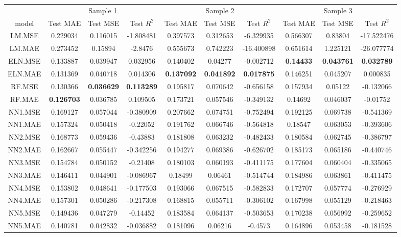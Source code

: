 \begin{table}[H]
\centering\begingroup\fontsize{6}{8}\selectfont

\begin{tabular}{cccccccccc}
\toprule
\multicolumn{1}{c}{ } & \multicolumn{3}{c}{Sample 1} & \multicolumn{3}{c}{Sample 2} & \multicolumn{3}{c}{Sample 3} \\
\cmidrule(l{3pt}r{3pt}){2-4} \cmidrule(l{3pt}r{3pt}){5-7} \cmidrule(l{3pt}r{3pt}){8-10}
model & Test MAE & Test MSE & Test $R^2$ & Test MAE & Test MSE & Test $R^2$ & Test MAE & Test MSE & Test $R^2$\\
\midrule
LM.MSE & 0.229034 & 0.116015 & -1.808481 & 0.397573 & 0.312653 & -6.329935 & 0.566307 & 0.83804 & -17.522476\\
LM.MAE & 0.273452 & 0.15894 & -2.8476 & 0.555673 & 0.742223 & -16.400898 & 0.651614 & 1.225121 & -26.077774\\
ELN.MSE & 0.133887 & 0.039947 & 0.032956 & 0.140402 & 0.04277 & -0.002712 & \textbf{0.14433} & \textbf{0.043761} & \textbf{0.032789}\\
ELN.MAE & 0.131369 & 0.040718 & 0.014306 & \textbf{0.137092} & \textbf{0.041892} & \textbf{0.017875} & 0.146251 & 0.045207 & 0.000835\\
RF.MSE & 0.130366 & \textbf{0.036629} & \textbf{0.113289} & 0.195817 & 0.070642 & -0.656158 & 0.157934 & 0.05122 & -0.132066\\
\addlinespace
RF.MAE & \textbf{0.126703} & 0.036785 & 0.109505 & 0.173721 & 0.057546 & -0.349132 & 0.14692 & 0.046037 & -0.01752\\
NN1.MSE & 0.169127 & 0.057044 & -0.380909 & 0.207662 & 0.074751 & -0.752494 & 0.192125 & 0.069738 & -0.541369\\
NN1.MAE & 0.157324 & 0.050418 & -0.22052 & 0.191762 & 0.066746 & -0.564818 & 0.18547 & 0.063053 & -0.393606\\
NN2.MSE & 0.168773 & 0.059436 & -0.43883 & 0.181808 & 0.063232 & -0.482433 & 0.180584 & 0.062745 & -0.386797\\
NN2.MAE & 0.162667 & 0.055447 & -0.342256 & 0.194277 & 0.069386 & -0.626702 & 0.185173 & 0.065186 & -0.440746\\
\addlinespace
NN3.MSE & 0.154784 & 0.050152 & -0.21408 & 0.180103 & 0.060193 & -0.411175 & 0.177604 & 0.060404 & -0.335065\\
NN3.MAE & 0.146411 & 0.044901 & -0.086967 & 0.18499 & 0.06461 & -0.514744 & 0.184986 & 0.063861 & -0.411475\\
NN4.MSE & 0.153802 & 0.048641 & -0.177503 & 0.193066 & 0.067515 & -0.582833 & 0.172707 & 0.057774 & -0.276929\\
NN4.MAE & 0.157301 & 0.050286 & -0.217308 & 0.168815 & 0.055711 & -0.306102 & 0.167998 & 0.055129 & -0.218463\\
NN5.MSE & 0.149436 & 0.047279 & -0.14452 & 0.183584 & 0.064137 & -0.503653 & 0.170238 & 0.056992 & -0.259652\\
\addlinespace
NN5.MAE & 0.140781 & 0.042832 & -0.036882 & 0.181096 & 0.06216 & -0.4573 & 0.164896 & 0.053458 & -0.181528\\
\bottomrule
\end{tabular}
\endgroup{}
\end{table}
